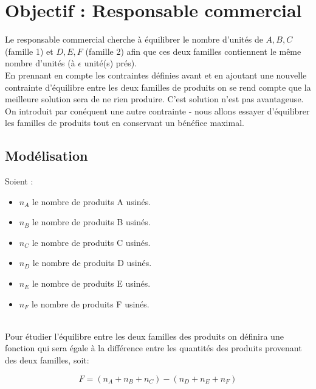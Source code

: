 \newpage
\section{Objectif : Responsable commercial}
Le responsable commercial cherche à équilibrer le nombre
d'unités de ${A, B, C}$ (famille 1) et ${D, E, F}$ (famille 2) afin que ces deux
familles contiennent le même nombre d'unités (à $\epsilon$ unité(s) prés).
~\\
En prennant en compte les contraintes définies avant et en ajoutant une nouvelle
contrainte d'équilibre entre les deux familles de produits on se rend compte que
la meilleure solution sera de ne rien produire. C'est solution n'est pas
avantageuse. On introduit par conéquent une autre contrainte - nous allons 
essayer d'équilibrer les familles de produits tout en conservant un bénéfice maximal.

\subsection{Modélisation}
Soient :
 \begin{itemize}
	\item $n_A$ le nombre de produits A usinés. 
	\item $n_B$ le nombre de produits B usinés. 
	\item $n_C$ le nombre de produits C usinés. 
	\item $n_D$ le nombre de produits D usinés. 
	\item $n_E$ le nombre de produits E usinés. 
	\item $n_F$ le nombre de produits F usinés. 
\end{itemize}
~\\
Pour étudier l'équilibre entre les deux familles des produits on définira une
fonction qui sera égale à la différence entre les quantités des produits
provenant des deux familles, soit: 

\begin{displaymath}
F = (n_A+n_B+n_C)-(n_D+n_E+n_F)
\end{displaymath}

